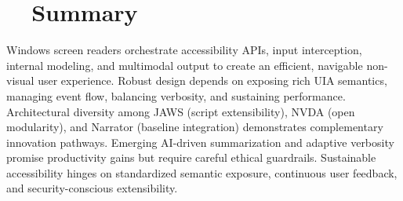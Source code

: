 \section{~~Summary}
\label{sec:sr-summary}
Windows screen readers orchestrate accessibility APIs, input interception, internal modeling, and multimodal output to create an efficient, navigable non-visual user experience. Robust design depends on exposing rich UIA semantics, managing event flow, balancing verbosity, and sustaining performance. Architectural diversity among JAWS (script extensibility), NVDA (open modularity), and Narrator (baseline integration) demonstrates complementary innovation pathways. Emerging AI-driven summarization and adaptive verbosity promise productivity gains but require careful ethical guardrails. Sustainable accessibility hinges on standardized semantic exposure, continuous user feedback, and security-conscious extensibility.

